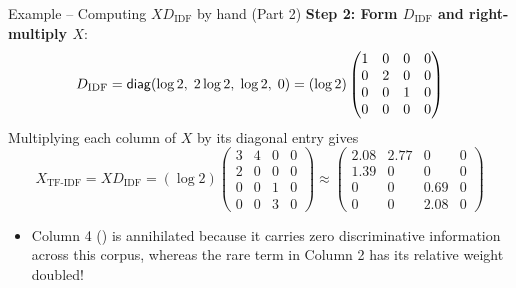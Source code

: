 \documentclass[aspectratio=169]{beamer}\usepackage[]{graphicx}\usepackage[]{xcolor}
\begin{document}
\begin{frame}{Example -- Computing $X D_{\text{IDF}}$ by hand (Part 2)}
\textbf{Step 2: Form $D_{\text{IDF}}$ and right-multiply $X$}:
\[
D_{\text{IDF}} = \mathsf{diag}(\log 2,\; 2\log 2,\; \log 2,\; 0) = (\log 2)\begin{pmatrix} 1 & 0 & 0 & 0 \\ 0 & 2 & 0 & 0 \\ 0 & 0 & 1 & 0 \\ 0 & 0 & 0 & 0 \end{pmatrix}
\]
\vfill
Multiplying each column of $X$ by its diagonal entry gives
\[
X_{\text{TF-IDF}} = X D_{\text{IDF}} = (\log 2)
\begin{pmatrix}
3 & 4 & 0 & 0 \\
2 & 0 & 0 & 0 \\
0 & 0 & 1 & 0 \\
0 & 0 & 3 & 0
\end{pmatrix}
\approx
\begin{pmatrix}
2.08 & 2.77 & 0 & 0 \\
1.39 & 0 & 0 & 0 \\
0 & 0 & 0.69 & 0 \\
0 & 0 & 2.08 & 0
\end{pmatrix}
\]
\vfill
\begin{itemize}
\item Column 4 () is annihilated because it carries zero discriminative information across this corpus, whereas the rare term  in Column 2 has its relative weight doubled!
\end{itemize}
\end{frame}
\end{document}
